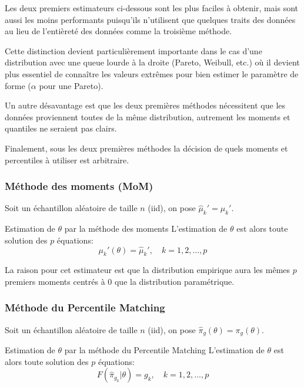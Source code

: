 \documentclass[10pt, french]{article}
\begin{document}
\begin{multicols*}{2}
Les deux premiers estimateurs ci-dessous sont les plus faciles à obtenir, mais sont aussi les moins performants puisqu'ils n'utilisent que quelques traits des données au lieu de l'entièreté des données comme la troisième méthode.

Cette distinction devient particulièrement importante dans le cas d'une distribution avec une queue lourde à la droite (Pareto, Weibull, etc.) où il devient plus essentiel de connaître les valeurs extrêmes pour bien estimer le paramètre de forme ($\alpha$ pour une Pareto).

Un autre désavantage est que les deux premières méthodes nécessitent que les données proviennent toutes de la même distribution, autrement les moments et quantiles ne seraient pas clairs.

Finalement, sous les deux premières méthodes la décision de quels moments et percentiles à utiliser est arbitraire.

\subsubsection*{Méthode des moments (MoM)}

Soit un échantillon aléatoire de taille $n$ (iid), on pose $\hat\mu_{k}' = \mu_{k}'$.
\begin{algo}{Estimation de $\theta$ par la méthode des moments}
L'estimation de $\theta$ est alors toute solution des $p$ équations:
\begin{equation*}
	\mu_{k}'(\theta) = \hat\mu_{k}', \quad	k = 1, 2, \dots, p
\end{equation*}
\end{algo}

La raison pour cet estimateur est que la distribution empirique aura les mêmes $p$ premiers moments centrés à 0 que la distribution paramétrique.

\subsubsection*{Méthode du \guillemotleft Percentile Matching \guillemotright}

Soit un échantillon aléatoire de taille $n$ (iid), on pose $\hat\pi_{g}(\theta) = \pi_{g}(\theta)$.

\begin{algo}{Estimation de $\theta$ par la méthode du \guillemotleft Percentile Matching \guillemotright}
L'estimation de $\theta$ est alors toute solution des $p$ équations:
\begin{equation*}
	F(\hat\pi_{g_{k}} | \theta)	=	g_{k}, \quad	k = 1, 2, \dots, p
\end{equation*}
\end{algo}


\end{multicols*}
\end{document}
